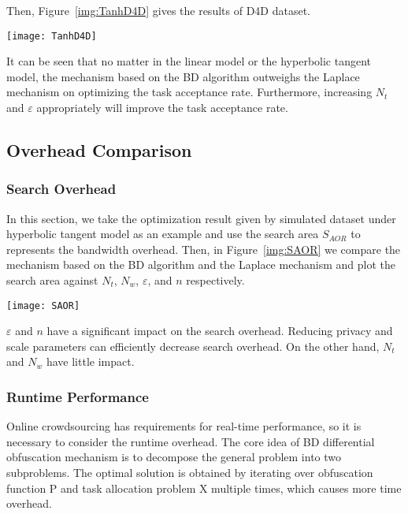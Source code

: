 Then, Figure~\ref{img:TanhD4D} gives the results of D4D dataset.

\begin{figure*}
\texttt{[image: TanhD4D]}
\caption{Hyperbolic Tangent Model \& D4D Dataset}
\label{img:TanhD4D}
\end{figure*}

It can be seen that no matter in the linear model or the hyperbolic tangent model, the mechanism based on the BD algorithm outweighs the Laplace mechanism on optimizing the task acceptance rate. Furthermore, increasing $N_t$ and $\varepsilon$ appropriately will improve the task acceptance rate.

\subsection{Overhead Comparison} %
\subsubsection{Search Overhead}
In this section, we take the optimization result given by simulated dataset under hyperbolic tangent model as an example and use the search area $S_{AOR}$ to represents the bandwidth overhead. Then, in Figure~\ref{img:SAOR} we compare the mechanism based on the BD algorithm and the Laplace mechanism and plot the search area against $N_t$, $N_w$, $\varepsilon$, and $n$ respectively.

\begin{figure*}
\texttt{[image: SAOR]}
\caption{Search Overhead}
\label{img:SAOR}
\end{figure*}

$\varepsilon$ and $n$ have a significant impact on the search overhead. Reducing privacy and scale parameters can efficiently decrease search overhead. On the other hand, $N_t$ and $N_w$ have little impact.

\subsubsection{Runtime Performance}
Online crowdsourcing has requirements for real-time performance, so it is necessary to consider the runtime overhead. The core idea of BD differential obfuscation mechanism is to decompose the general problem into two subproblems. The optimal solution is obtained by iterating over obfuscation function P and task allocation problem X multiple times, which causes more time overhead.

